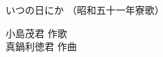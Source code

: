 \documentclass[10pt,b5j]{tarticle} %
\begin{document}
\begin{minipage}[c]{0.7\hsize} %
    \begin{center}
        {\LARGE
            いつの日にか %
        }
        {\small 
            （昭和五十一年寮歌） %
        }
    \end{center}
\end{minipage}
\begin{minipage}[c]{0.3\hsize} %
    \begin{flushright} %
        小島茂君 作歌\\真鍋利徳君 作曲 %
    \end{flushright}
\end{minipage}
\end{document}
